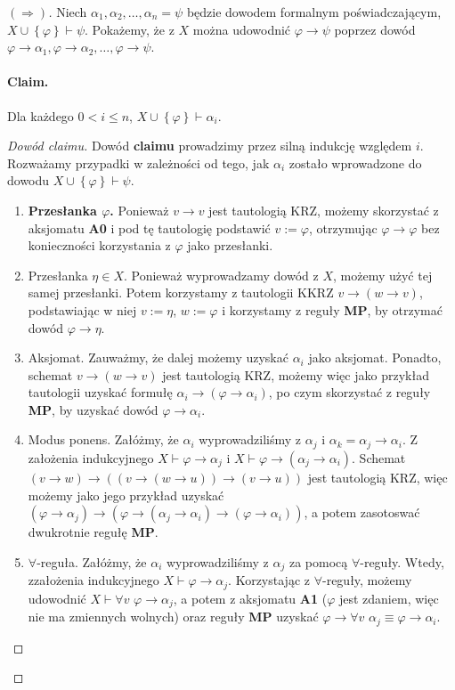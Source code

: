 \begin{proof}[\( (\Rightarrow) \)]
    Niech \( \alpha_1, \alpha_2, \ldots, \alpha_n = \psi \) będzie dowodem formalnym poświadczającym, \( X \cup \left\{ \varphi \right\} \vdash \psi \). Pokażemy, że z \( X \) można udowodnić \( \varphi \to \psi \) poprzez dowód \( \varphi \to \alpha_1, \varphi \to \alpha_2, \ldots, \varphi \to \psi \).

    \paragraph{Claim.} Dla każdego \( 0 < i \leqslant n \), \( X \cup \left\{ \varphi \right\} \vdash \alpha_i \).

\begin{proof}[Dowód claimu]
    Dowód \textbf{claimu} prowadzimy przez silną indukcję względem \( i \). Rozważamy przypadki w zależności od tego, jak \( \alpha_i \) zostało wprowadzone do dowodu \( X \cup \left\{ \varphi \right\} \vdash \psi\).

    \begin{enumerate}
        \item \textbf{Przesłanka \( \varphi \).} Ponieważ \( v \to v \) jest tautologią KRZ, możemy skorzystać z aksjomatu \textbf{A0} i pod tę tautologię podstawić \(v := \varphi \), otrzymując \( \varphi \to \varphi \) bez konieczności korzystania z \( \varphi \) jako przesłanki.
        \item Przesłanka \( \eta \in X \). Ponieważ wyprowadzamy dowód z \( X \), możemy użyć tej samej przesłanki. Potem korzystamy z tautologii KKRZ \( v \to (w \to v) \), podstawiając w niej \( v := \eta \), \( w := \varphi \) i korzystamy z reguły \textbf{MP}, by otrzymać dowód \( \varphi \to \eta \).
        \item Aksjomat. Zauważmy, że dalej możemy uzyskać \( \alpha_i \) jako aksjomat. Ponadto, schemat \( v \to (w \to v) \) jest tautologią KRZ, możemy więc jako przykład tautologii uzyskać formułę \( \alpha_i \to (\varphi \to \alpha_i) \), po czym skorzystać z reguły \textbf{MP}, by uzyskać dowód \( \varphi \to \alpha_i \).
        \item Modus ponens. Załóżmy, że \( \alpha_i \) wyprowadziliśmy z \( \alpha_j \) i \( \alpha_k = \alpha_j \to \alpha_i \). Z założenia indukcyjnego \( X \vdash \varphi \to \alpha_j \) i \( X \vdash \varphi \to (\alpha_j \to \alpha_i) \). Schemat \( (v \to w) \to ((v \to (w \to u)) \to (v \to u)) \) jest tautologią KRZ, więc możemy jako jego przykład uzyskać \( (\varphi \to \alpha_j) \to (\varphi \to (\alpha_j \to \alpha_i) \to (\varphi \to \alpha_i)) \), a potem zasotoswać dwukrotnie regułę \textbf{MP}.
        \item \( \forall \)-reguła. Załóżmy, że \( \alpha_i \) wyprowadziliśmy z \( \alpha_j \) za pomocą \( \forall \)-reguły. Wtedy, zzałożenia indukcyjnego \( X \vdash \varphi \to \alpha_j \). Korzystając z \( \forall \)-reguły, możemy udowodnić \( X \vdash \forall v\,\,\varphi \to \alpha_j \), a potem z aksjomatu \textbf{A1} (\( \varphi \) jest zdaniem, więc nie ma zmiennych wolnych) oraz reguły \textbf{MP} uzyskać \( \varphi \to \forall v\,\,\alpha_j \equiv \varphi \to \alpha_i \).
    \end{enumerate}
    

\end{proof}
\end{proof}
